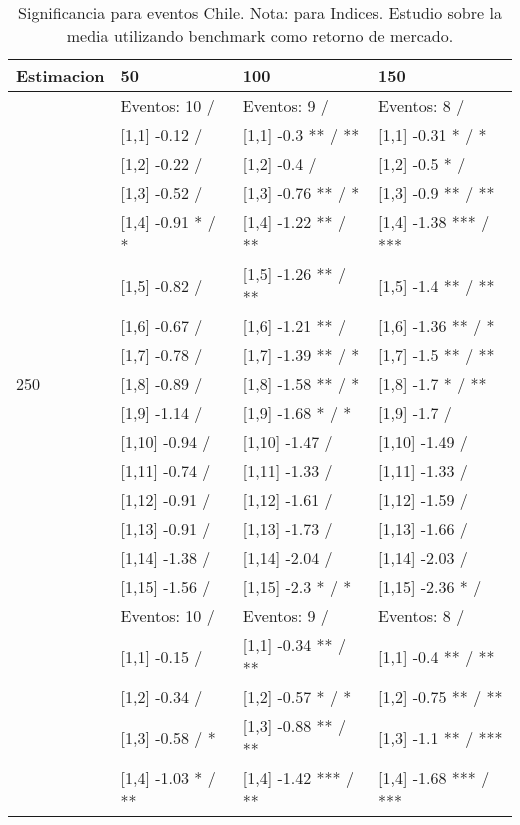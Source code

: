 \begin{table}

\caption{Significancia para eventos Chile. Nota: para Indices. Estudio sobre la media utilizando benchmark como retorno de mercado.}
\centering
\begin{tabular}[t]{llll}
\toprule
Estimacion & 50 & 100 & 150\\
\midrule
 & Eventos:  10 / & Eventos:  9 / & Eventos:  8 /\\
 & {}[1,1] -0.12  / & {}[1,1] -0.3 ** / ** & {}[1,1] -0.31 * / *\\
 & {}[1,2] -0.22  / & {}[1,2] -0.4  / & {}[1,2] -0.5 * /\\
 & {}[1,3] -0.52  / & {}[1,3] -0.76 ** / * & {}[1,3] -0.9 ** / **\\
 & {}[1,4] -0.91 * / * & {}[1,4] -1.22 ** / ** & {}[1,4] -1.38 *** / ***\\
\addlinespace
 & {}[1,5] -0.82  / & {}[1,5] -1.26 ** / ** & {}[1,5] -1.4 ** / **\\
 & {}[1,6] -0.67  / & {}[1,6] -1.21 ** / & {}[1,6] -1.36 ** / *\\
 & {}[1,7] -0.78  / & {}[1,7] -1.39 ** / * & {}[1,7] -1.5 ** / **\\
250 & {}[1,8] -0.89  / & {}[1,8] -1.58 ** / * & {}[1,8] -1.7 * / **\\
 & {}[1,9] -1.14  / & {}[1,9] -1.68 * / * & {}[1,9] -1.7  /\\
\addlinespace
 & {}[1,10] -0.94  / & {}[1,10] -1.47  / & {}[1,10] -1.49  /\\
 & {}[1,11] -0.74  / & {}[1,11] -1.33  / & {}[1,11] -1.33  /\\
 & {}[1,12] -0.91  / & {}[1,12] -1.61  / & {}[1,12] -1.59  /\\
 & {}[1,13] -0.91  / & {}[1,13] -1.73  / & {}[1,13] -1.66  /\\
 & {}[1,14] -1.38  / & {}[1,14] -2.04  / & {}[1,14] -2.03  /\\
\addlinespace
 & {}[1,15] -1.56  / & {}[1,15] -2.3 * / * & {}[1,15] -2.36 * /\\
 & Eventos:  10 / & Eventos:  9 / & Eventos:  8 /\\
 & {}[1,1] -0.15  / & {}[1,1] -0.34 ** / ** & {}[1,1] -0.4 ** / **\\
 & {}[1,2] -0.34  / & {}[1,2] -0.57 * / * & {}[1,2] -0.75 ** / **\\
 & {}[1,3] -0.58  / * & {}[1,3] -0.88 ** / ** & {}[1,3] -1.1 ** / ***\\
\addlinespace
 & {}[1,4] -1.03 * / ** & {}[1,4] -1.42 *** / ** & {}[1,4] -1.68 *** / ***\\

\end{tabular}
\end{table}
